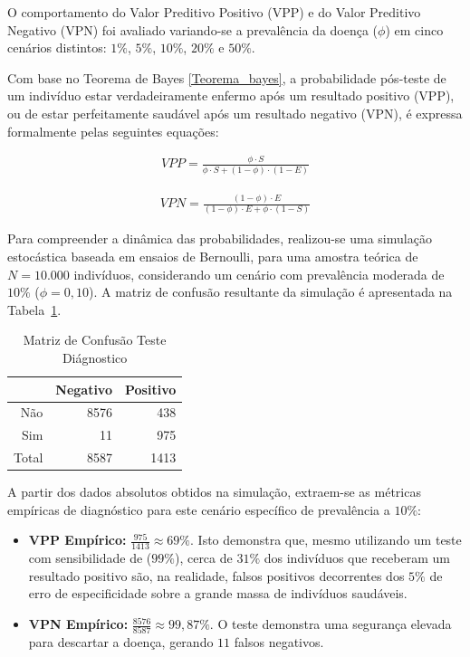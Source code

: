 O comportamento do Valor Preditivo Positivo (VPP) e do Valor Preditivo Negativo (VPN) foi avaliado variando-se a prevalência da doença ($\phi$) em cinco cenários distintos: $1\%$, $5\%$, $10\%$, $20\%$ e $50\%$.


Com base no Teorema de Bayes \ref{Teorema_bayes}, a probabilidade pós-teste de um indivíduo estar verdadeiramente enfermo após um resultado positivo (VPP), ou de estar perfeitamente saudável após um resultado negativo (VPN), é expressa formalmente pelas seguintes equações:

\begin{align*}
	VPP = \frac{\phi \cdot S}{\phi \cdot S + (1 - \phi) \cdot (1 - E)}
\end{align*}

\begin{align*}
	VPN = \frac{(1 - \phi) \cdot E}{(1 - \phi) \cdot E + \phi \cdot (1 - S)}
\end{align*}

Para compreender a dinâmica das probabilidades, realizou-se uma simulação estocástica baseada em ensaios de Bernoulli, para uma amostra teórica de $N = 10.000$ indivíduos, considerando um cenário com prevalência moderada de $10\%$ ($\phi = 0{,}10$). A matriz de confusão resultante da simulação é apresentada na Tabela~\ref{tab:matriz_confusao_teste_diagnostico}.

\begin{table}[ht]
	\centering
	\begin{tabular}{rrr}
		\hline
		& Negativo & Positivo \\ 
		\hline
		Não & 8576 & 438 \\ 
		Sim &  11 & 975 \\ 
		\hline
		Total & 8587 & 1413 \\
		\hline
	\end{tabular}
	\caption{Matriz de Confusão Teste Diágnostico} 
	\label{tab:matriz_confusao_teste_diagnostico}
\end{table}

A partir dos dados absolutos obtidos na simulação, extraem-se as métricas empíricas de diagnóstico para este cenário específico de prevalência a $10\%$:
\begin{itemize}
	\item \textbf{VPP Empírico:} $\frac{975}{1413} \approx 69\%$. Isto demonstra que, mesmo utilizando um teste com sensibilidade de ($99\%$), cerca de $31\%$ dos indivíduos que receberam um resultado positivo são, na realidade, falsos positivos decorrentes dos $5\%$ de erro de especificidade sobre a grande massa de indivíduos saudáveis.
	\item \textbf{VPN Empírico:} $\frac{8576}{8587} \approx 99{,}87\%$. O teste demonstra uma segurança elevada para descartar a doença, gerando $11$ falsos negativos.
\end{itemize}


